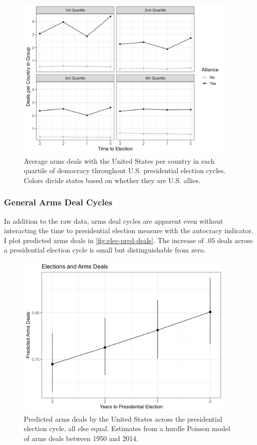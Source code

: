 \documentclass[12pt]{article}
\begin{document}
\begin{figure}[htpb]
	\centering
		\includegraphics[width=0.95\textwidth]{deals-democ-raw.png}
	\caption{Average arms deals with the United States per country in each quartile of democracy throughout U.S. presidential election cycles. Colors divide states based on whether they are U.S. allies.}
	\label{fig:deals-democ-raw}
\end{figure}


\subsubsection{General Arms Deal Cycles}

In addition to the raw data, arms deal cycles are apparent even without interacting the time to presidential election measure with the autocracy indicator.
I plot predicted arms deals in \autoref{fig:elec-pred-deals}. 
The increase of .05 deals across a presidential election cycle is small but distinguishable from zero. 


\begin{figure}[htpb]
	\centering
		\includegraphics[width=0.95\textwidth]{elec-pred-deals.png}
	\caption{Predicted arms deals by the United States across the presidential election cycle, all else equal. Estimates from a hurdle Poisson model of arms deals between 1950 and 2014. }
	\label{fig:elec-pred-deals}
\end{figure}
\end{document}
